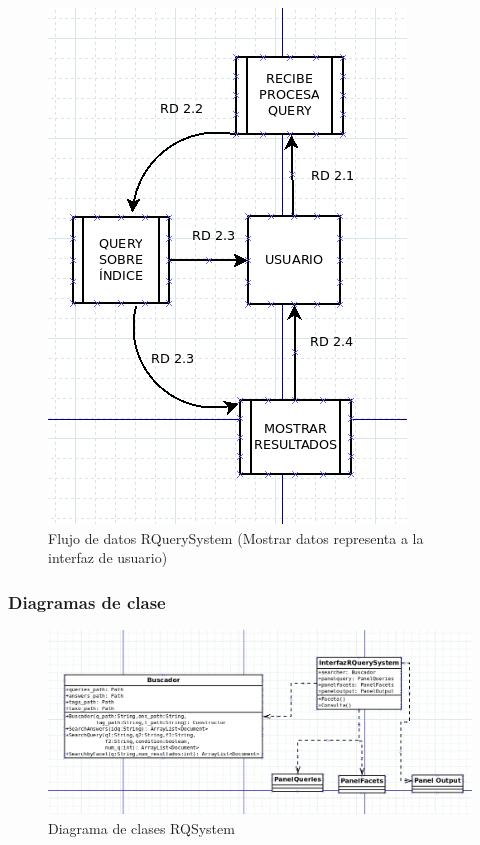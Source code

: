 \begin{figure}[H] %
	\centering
	\includegraphics[scale=0.5]{r-fd.png}  %
	\caption{Flujo de datos RQuerySystem (Mostrar datos representa a la interfaz de usuario)} 
\end{figure}

\subsubsection{Diagramas de clase}

\begin{figure}[H] %
	\centering
	\includegraphics[scale=0.4]{dcrqs.png}  %
	\caption{Diagrama de clases RQSystem} 
\end{figure}



